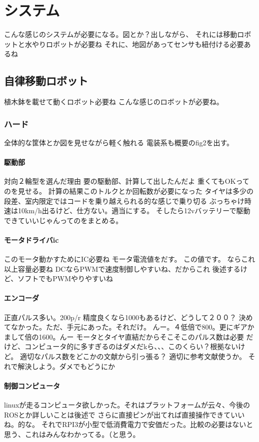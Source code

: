 \chapter{システム}
こんな感じのシステムが必要になる。図とか？出しながら、
それには移動ロボットと水やりロボットが必要ね
それに、地図があってセンサも紐付ける必要あるね
\section{自律移動ロボット}
植木鉢を載せて動くロボット必要ね
こんな感じのロボットが必要ね。
\subsection{ハード}
全体的な筐体とか図を見せながら軽く触れる
電装系も概要のfig2を出す。
\subsubsection{駆動部}
対向２輪型を選んだ理由
要の駆動部、計算して出したんだよ
重くてもOKってのを見せる。
計算の結果このトルクとか回転数が必要になった
タイヤは多少の段差、室内限定ではコードを乗り越えられる的な感じで乗り切る
ぶっちゃけ時速は10km/h出るけど、仕方ない。適当にする。
そしたら12vバッテリーで駆動できていいじゃんってのをまとめる。
\subsubsection{モータドライバic}
このモータ動かすためにIC必要ね
モータ電流値をだす。
この値です。
ならこれ以上容量必要ね
DCならPWMで速度制御しやすいね、だからこれ
後述するけど、ソフトでもPWMやりやすいね
\subsubsection{エンコーダ}
正直パルス多い。200p/r
精度良くなら1000もあるけど、どうして２００？
決めてなかった。ただ、手元にあった。それだけ。
んー。４低倍で800。更にギアかまして倍の1600。んー
モータとタイヤ直結だからそこそこのパルス数は必要
だけど、コンピュータ的に多すぎるのはダメだkら、、、このくらい？根拠ないけど。
適切なパルス数をどこかの文献から引っ張る？
適切に参考文献使うか。
それで解決しよう。ダメでもどうにか
\subsubsection{制御コンピュータ}
linuxが走るコンピュータ欲しかった。それはプラットフォームが云々、今後のROSとか詳しいことは後述で
さらに直接ピンが出てれば直接操作できていいね。的な。
それでRPI3が小型で低消費電力で安価だった。比較の必要はないと思う、これはみんなわかってる。（と思う。
